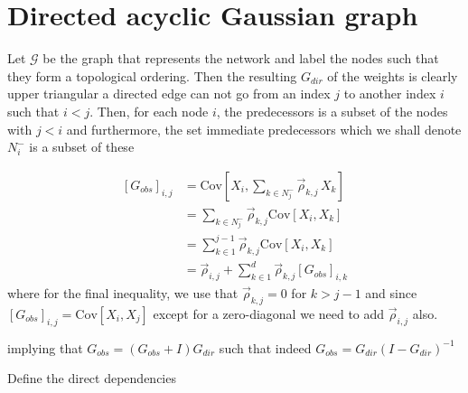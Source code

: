 \documentclass[../Thesis.tex]{subfiles}
\begin{document}
\newpage
\section{Directed acyclic Gaussian graph}\label{sec:General Gaussian graph}


Let $\mathcal{G}$ be the graph that represents the network and label the nodes such that they form a topological ordering. Then the resulting $G_{dir}$ of the weights is clearly upper triangular a directed edge can not go from an index $j$ to another index $i$ such that $i<j$. Then, for each node $i$, the predecessors is a subset of the nodes with $j < i$ and furthermore, the set immediate predecessors which we shall denote $N^-_i$ is a subset of these

\begin{equation}
    \begin{split}
        \left[G_{obs}\right]_{i,j} & = \text{Cov}\left[X_i , \sum_{k \in N^-_j} \vec{\rho}_{k,j} \, X_k\right] \\
                                   & = \sum_{k \in N^-_j}\vec{\rho}_{k,j} \text{Cov}\left[X_i, X_k\right]      \\
                                   & = \sum_{k \in 1}^{j-1} \vec{\rho}_{k,j} \text{Cov}\left[X_i, X_k\right]   \\
                                   & = \vec{\rho}_{i,j} + \sum_{k \in 1}^{d} \vec{\rho}_{k,j} \left[G_{obs}\right]_{i,k}
    \end{split}
\end{equation}
where for the final inequality, we use that $\vec{\rho}_{k,j} = 0$ for $k > j-1$ and since $\left[G_{obs}\right]_{i,j} = \text{Cov}\left[X_i,X_j\right]$ except for a zero-diagonal we need to add $\vec{\rho}_{i,j}$ also.

implying that $G_{obs} = \left(G_{obs} + I\right) G_{dir}$ such that indeed $G_{obs} = G_{dir} \left(I - G_{dir}\right)^{-1}$


Define the direct dependencies




\end{document}
